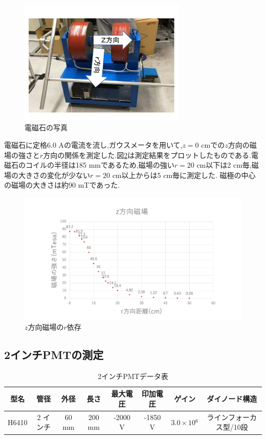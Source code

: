 \begin{figure}[tbp]
	\centering
	\includegraphics[width=8cm]{fig/iguchi/magnetphoto.pdf}
	\caption{電磁石の写真}
	\label{magphoto}
\end{figure}

\newpage
電磁石に定格6.0 Aの電流を流し,ガウスメータを用いて,$z=0$ cmでの$z$方向の磁場の強さと$r$方向の関係を測定した.図\ref{maggraph01}は測定結果をプロットしたものである.電磁石のコイルの半径は185 mmであるため,磁場の強い$r=20$ cm以下は2 cm毎,磁場の大きさの変化が少ない$r=20$ cm以上からは5 cm毎に測定した.
磁極の中心の磁場の大きさは約90 mTであった.
\begin{figure}[tbp]
	\centering
	\includegraphics[width=15cm]{fig/iguchi/maggraph01.pdf}
	\caption{$z$方向磁場の$r$依存}
	\label{maggraph01}
\end{figure}


\subsection{2インチPMTの測定}\label{noFe}

\begin{table}[tbp]
	\centering
	 \begin{tabular}{cccccccc}\hline
	型名& 管径 & 外径 & 長さ & 最大電圧 & 印加電圧 & ゲイン & ダイノード構造 \\ \hline \hline
	H6410 & 2 インチ & 60 mm & 200 mm & -2000 V & -1850 V & $3.0\times10{^{6}}$ &ラインフォーカス型/10段 \\ \hline
	\end{tabular}
	  \caption{2インチPMTデータ表}
	  \label{PMTdata}
\end{table}

